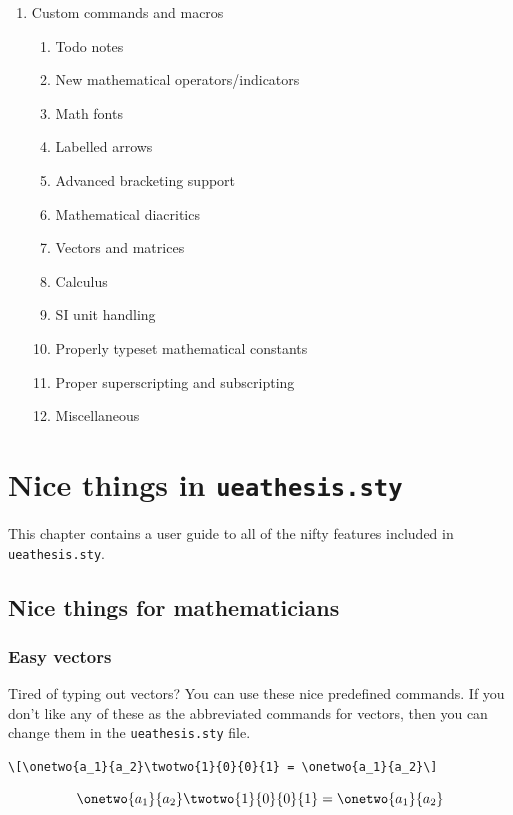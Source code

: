 \begin{enumerate}[\bf 1]
\item Custom commands and macros
\begin{enumerate}[5.1]
\item Todo notes
\item New mathematical operators/indicators
\item Math fonts
\item Labelled arrows
\item Advanced bracketing support
\item Mathematical diacritics
\item Vectors and matrices
\item Calculus
\item SI unit handling
\item Properly typeset mathematical constants
\item Proper superscripting and subscripting
\item Miscellaneous
\end{enumerate}
\end{enumerate}


\chapter{Nice things in \texttt{ueathesis.sty}}

\begin{synopsis}
\noindent This chapter contains a user guide to all of the nifty features included in \verb|ueathesis.sty|.
\end{synopsis}

\section{Nice things for mathematicians}

\subsection{Easy vectors}

Tired of typing out vectors? You can use these nice predefined commands. If you don't like any of these as the abbreviated commands for vectors, then you can change them in the \verb|ueathesis.sty| file.

\begin{verbatim}
\[\onetwo{a_1}{a_2}\twotwo{1}{0}{0}{1} = \onetwo{a_1}{a_2}\]
\end{verbatim}

\[\onetwo{a_1}{a_2}\twotwo{1}{0}{0}{1} = \onetwo{a_1}{a_2}\]


